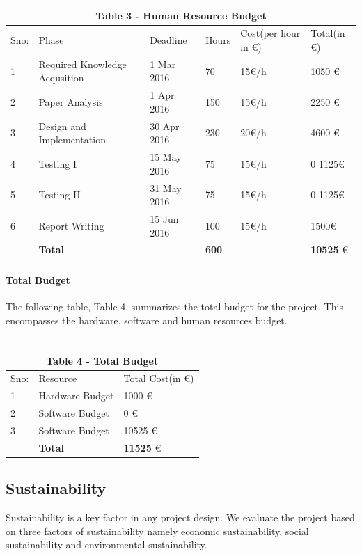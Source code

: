 \begin{tabular}{|p{0.8cm}||p{4cm}|p{2.5cm}|p{1cm}|p{1.5cm}|p{2cm}|}
 \hline
 \multicolumn{6}{|c|}{Table 3 - Human Resource Budget} \\
 \hline
 Sno: & Phase&Deadline &Hours &Cost(per hour in \euro)&Total(in \euro)\\
 \hline
1   & Required Knowledge Acqusition  &1 Mar 2016 &  70  & 15\euro/h & 1050 \euro \\
2   & Paper Analysis  &1 Apr 2016& 150 &  15\euro/h  & 2250 \euro \\
3   & Design and Implementation&30 Apr 2016 &230&  20\euro/h  & 4600 \euro \\
4   & Testing I  &15 May 2016&75 &15\euro/h  & 0 1125\euro \\
5   & Testing II  &31 May 2016&75 &  15\euro/h  & 0 1125\euro \\
6   & Report Writing  &15 Jun 2016&100 &  15\euro/h  & 1500\euro \\
\hline
\hline
   & \textbf{Total}  &  & \textbf{600}&   & \textbf{10525} \euro \\
 \hline
\end{tabular}

\paragraph{Total Budget}
The following table, Table 4, summarizes the total budget for the project. This encompasses the
hardware, software and human resources budget.
\\ \\ 
\begin{tabular}{|p{1cm}||p{4cm}|p{3cm}|}
 \hline
 \multicolumn{3}{|c|}{Table 4 - Total Budget} \\
 \hline
 Sno: &Resource &Total Cost(in \euro) \\
 \hline
 1   & Hardware Budget  & 1000 \euro \\
 2   & Software Budget  & 0 \euro \\
 3   & Software Budget  & 10525 \euro \\
 \hline
\hline
   & \textbf{Total}  & \textbf{11525} \euro \\
 \hline
 
 

\end{tabular}


\subsection{Sustainability}
Sustainability is a key factor in any project design. We evaluate the project based on three
factors of sustainability namely economic sustainability, social sustainability and environmental
sustainability.
